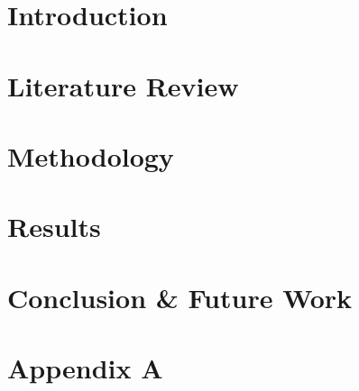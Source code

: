 \documentclass[11pt]{report}
\begin{document}


\newpage
\tableofcontents
\listoffigures
\listoftables
\lstlistoflistings
\newpage

\begin{abstract}
  \lipsum[1-3]
\end{abstract}
\onehalfspacing
\chapter{Introduction}
% 
% 

\chapter{Literature Review}


\chapter{Methodology}

\chapter{Results}


\chapter{Conclusion \& Future Work }




\chapter{Appendix A}
\appendix
\end{document}
